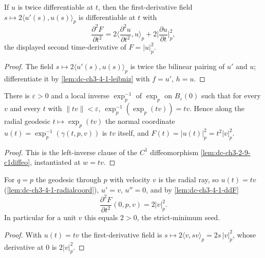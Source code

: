 \begin{lemma}
  \label{lem:dc-ch3-4-1-ddF}


  If $u$ is twice differentiable at $t$, then the first-derivative field
  $s\mapsto 2\langle u'(s),u(s)\rangle_p$ is differentiable at $t$ with
  $$\frac{\partial^2 F}{\partial t^2}
    = 2\Big\langle\frac{\partial^2 u}{\partial t^2},u\Big\rangle_p
      + 2\Big|\frac{\partial u}{\partial t}\Big|_p^2,$$
  the displayed second time-derivative of $F=|u|_p^2$.
\end{lemma}
\begin{proof}
  \sketch

  The field $s\mapsto 2\langle u'(s),u(s)\rangle_p$ is twice the bilinear pairing
  of $u'$ and $u$; differentiate it by \cref{lem:dc-ch3-4-1-leibniz} with
  $f=u'$, $h=u$.
\end{proof}

\begin{lemma}
  \label{lem:dc-ch3-4-1-radialcoord}


  There is $\varepsilon>0$ and a local inverse $\exp_p^{-1}$ of $\exp_p$ on
  $B_\varepsilon(0)$ such that for every $v$ and every $t$ with
  $\|tv\|<\varepsilon$, $\exp_p^{-1}(\exp_p(tv))=tv$. Hence along the radial
  geodesic $t\mapsto\exp_p(tv)$ the normal coordinate $u(t)=\exp_p^{-1}(\gamma(t,p,v))$
  is $tv$ itself, and $F(t)=|u(t)|_p^2=t^2|v|_p^2$.
\end{lemma}
\begin{proof}
  \sketch

  This is the left-inverse clause of the $C^1$ diffeomorphism
  \cref{lem:dc-ch3-2-9-c1diffeo}, instantiated at $w=tv$.
\end{proof}

\begin{lemma}[center Hessian: $\partial^2 F/\partial t^2(0,p,v)=2|v|^2$]
  \label{lem:dc-ch3-4-1-hessian-center}


  For $q=p$ the geodesic through $p$ with velocity $v$ is the radial ray, so
  $u(t)=tv$ (\cref{lem:dc-ch3-4-1-radialcoord}), $u'=v$, $u''=0$, and by
  \cref{lem:dc-ch3-4-1-ddF}
  $$\frac{\partial^2 F}{\partial t^2}(0,p,v)=2|v|_p^2.$$
  In particular for a unit $v$ this equals $2>0$, the strict-minimum seed.
\end{lemma}
\begin{proof}
  \sketch

  With $u(t)=tv$ the first-derivative field is
  $s\mapsto 2\langle v,sv\rangle_p=2s\,|v|_p^2$, whose derivative at $0$ is
  $2|v|_p^2$.
\end{proof}

